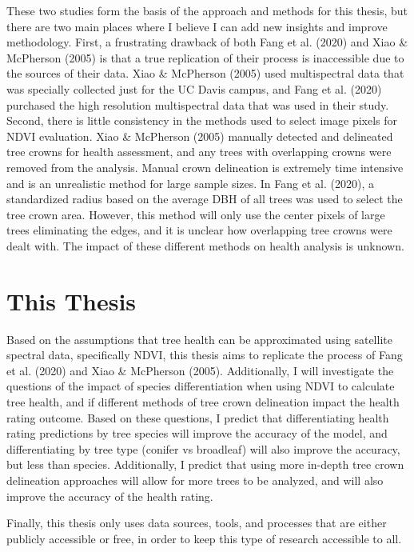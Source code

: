 \documentclass[12pt,twoside]{reedthesis}
\begin{document}
These two studies form the basis of the approach and methods for this thesis, but there are two main places where I believe I can add new insights and improve methodology. First, a frustrating drawback of both Fang et al. (2020) and Xiao \& McPherson (2005) is that a true replication of their process is inaccessible due to the sources of their data. Xiao \& McPherson (2005) used multispectral data that was specially collected just for the UC Davis campus, and Fang et al. (2020) purchased the high resolution multispectral data that was used in their study. Second, there is little consistency in the methods used to select image pixels for NDVI evaluation. Xiao \& McPherson (2005) manually detected and delineated tree crowns for health assessment, and any trees with overlapping crowns were removed from the analysis. Manual crown delineation is extremely time intensive and is an unrealistic method for large sample sizes. In Fang et al. (2020), a standardized radius based on the average DBH of all trees was used to select the tree crown area. However, this method will only use the center pixels of large trees eliminating the edges, and it is unclear how overlapping tree crowns were dealt with. The impact of these different methods on health analysis is unknown.

\hypertarget{this-thesis}{%
\section{This Thesis}\label{this-thesis}}

Based on the assumptions that tree health can be approximated using satellite spectral data, specifically NDVI, this thesis aims to replicate the process of Fang et al. (2020) and Xiao \& McPherson (2005). Additionally, I will investigate the questions of the impact of species differentiation when using NDVI to calculate tree health, and if different methods of tree crown delineation impact the health rating outcome. Based on these questions, I predict that differentiating health rating predictions by tree species will improve the accuracy of the model, and differentiating by tree type (conifer vs broadleaf) will also improve the accuracy, but less than species. Additionally, I predict that using more in-depth tree crown delineation approaches will allow for more trees to be analyzed, and will also improve the accuracy of the health rating.

Finally, this thesis only uses data sources, tools, and processes that are either publicly accessible or free, in order to keep this type of research accessible to all.
\end{document}
